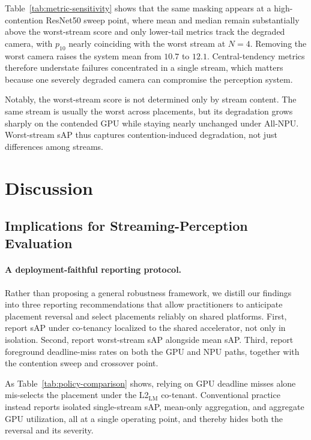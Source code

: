 \documentclass[runningheads]{llncs}
\newcommand{\Llm}{L2$_{\text{LM}}$}
\begin{document}
Table~\ref{tab:metric-sensitivity} shows that the same masking appears at a high-contention ResNet50 sweep point, where mean and median remain substantially above the worst-stream score and only lower-tail metrics track the degraded camera, with $p_{10}$ nearly coinciding with the worst stream at $N{=}4$. Removing the worst camera raises the system mean from $10.7$ to $12.1$. Central-tendency metrics therefore understate failures concentrated in a single stream, which matters because one severely degraded camera can compromise the perception system.

Notably, the worst-stream score is not determined only by stream content. The same stream is usually the worst across placements, but its degradation grows sharply on the contended GPU while staying nearly unchanged under All-NPU. Worst-stream sAP thus captures contention-induced degradation, not just differences among streams.

\section{Discussion}
\label{sec:discussion}

\subsection{Implications for Streaming-Perception Evaluation}
\label{sec:discussion:evaluation}

\paragraph{\textbf{A deployment-faithful reporting protocol.}}
Rather than proposing a general robustness framework, we distill our findings into three reporting recommendations that allow practitioners to anticipate placement reversal and select placements reliably on shared platforms. First, report sAP under co-tenancy localized to the shared accelerator, not only in isolation. Second, report worst-stream sAP alongside mean sAP. Third, report foreground deadline-miss rates on both the GPU and NPU paths, together with the contention sweep and crossover point.

As Table~\ref{tab:policy-comparison} shows, relying on GPU deadline misses alone mis-selects the placement under the \Llm{} co-tenant.
Conventional practice instead reports isolated single-stream sAP, mean-only aggregation, and aggregate GPU utilization, all at a single operating point, and thereby hides both the reversal and its severity.
\end{document}
